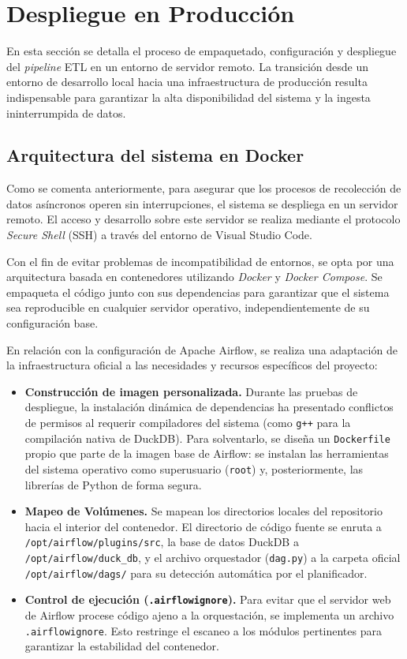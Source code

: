 \section{Despliegue en Producción}
\label{sec:despliegue_automatizacion}

En esta sección se detalla el proceso de empaquetado, configuración y despliegue del \textit{pipeline} ETL en un entorno de servidor remoto. La transición desde un entorno de desarrollo local hacia una infraestructura de producción resulta indispensable para garantizar la alta disponibilidad del sistema y la ingesta ininterrumpida de datos. 

\subsection{Arquitectura del sistema en Docker}
\label{subsec:arquitectura_docker}
Como se comenta anteriormente, para asegurar que los procesos de recolección de datos asíncronos operen sin interrupciones, el sistema se despliega en un servidor remoto. El acceso y desarrollo sobre este servidor se realiza mediante el protocolo \textit{Secure Shell} (SSH) a través del entorno de Visual Studio Code. 

Con el fin de evitar problemas de incompatibilidad de entornos, se opta por una arquitectura basada en contenedores utilizando \textit{Docker} y \textit{Docker Compose}. Se empaqueta el código junto con sus dependencias para garantizar que el sistema sea reproducible en cualquier servidor operativo, independientemente de su configuración base.

En relación con la configuración de Apache Airflow, se realiza una adaptación de la infraestructura oficial a las necesidades y recursos específicos del proyecto:
\begin{itemize}
	\item \textbf{Construcción de imagen personalizada.} Durante las pruebas de despliegue, la instalación dinámica de dependencias ha presentado conflictos de permisos al requerir compiladores del sistema (como \texttt{g++} para la compilación nativa de DuckDB). Para solventarlo, se diseña un \texttt{Dockerfile} propio que parte de la imagen base de Airflow: se instalan las herramientas del sistema operativo como superusuario (\texttt{root}) y, posteriormente, las librerías de Python de forma segura.
	\item \textbf{Mapeo de Volúmenes.} Se mapean los directorios locales del repositorio hacia el interior del contenedor. El directorio de código fuente se enruta a \texttt{/opt/airflow/plugins/src}, la base de datos DuckDB a \texttt{/opt/airflow/duck\_db}, y el archivo orquestador (\texttt{dag.py}) a la carpeta oficial \texttt{/opt/airflow/dags/} para su detección automática por el planificador.
	\item \textbf{Control de ejecución (\texttt{.airflowignore}).} Para evitar que el servidor web de Airflow procese código ajeno a la orquestación, se implementa un archivo \texttt{.airflowignore}. Esto restringe el escaneo a los módulos pertinentes para garantizar la estabilidad del contenedor.
\end{itemize}

